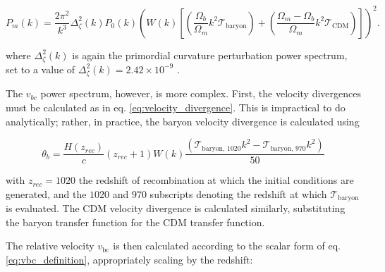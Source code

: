\documentclass[floats,floatfix,showpacs,amssymb,prd,superscriptaddress,nofootinbib, 11pt]{revtex4-2} %
\newcommand{\red}{\textcolor{red}}
\begin{document}
\begin{equation}
    P_m(k) = \frac{2\pi^2}{k^3} \Delta_\zeta ^2 (k) P_0 (k) \left( W(k) \left[ \left( \frac{\Omega_b}{\Omega_m} k^2 \mathcal{T}_{\text{baryon}} \right) + \left( \frac{\Omega_m - \Omega_b}{\Omega_m} k^2 \mathcal{T}_{\text{CDM}} \right) \right] \right)^2.
\end{equation}

\noindent where $\Delta_\zeta ^2 (k)$ is again the primordial curvature perturbation power spectrum, set to a value of $\Delta_\zeta ^2 (k) = 2.42 \times 10^{-9}$ \citep{Dunkley_2009}.



The $v_{bc}$ power spectrum, however, is more complex. First, the velocity divergences must be calculated as in eq. \ref{eq:velocity_divergence}. This is impractical to do analytically; rather, in practice, the baryon velocity divergence is calculated using

\begin{equation}
    \theta_b = \frac{H(z_{rec})}{c} (z_{rec} + 1) W(k) \frac{\left( \mathcal{T}_{\text{baryon, 1020}} k^2 - \mathcal{T}_{\text{baryon, 970}} k^2 \right)}{50} 
    \label{eq:velocity_divergence_practical_calculation}
\end{equation}

\noindent with $z_{rec} = 1020$ the redshift of recombination at which the initial conditions are generated, and the $1020$ and $970$ subscripts denoting the redshift at which $\mathcal{T}_{\text{baryon}}$ is evaluated. The CDM velocity divergence is calculated similarly, substituting the baryon transfer function for the CDM transfer function.

The relative velocity 
$v_\text{bc}$ is then calculated according to the scalar form of eq. \ref{eq:vbc_definition}, appropriately scaling by the redshift:
\end{document}
